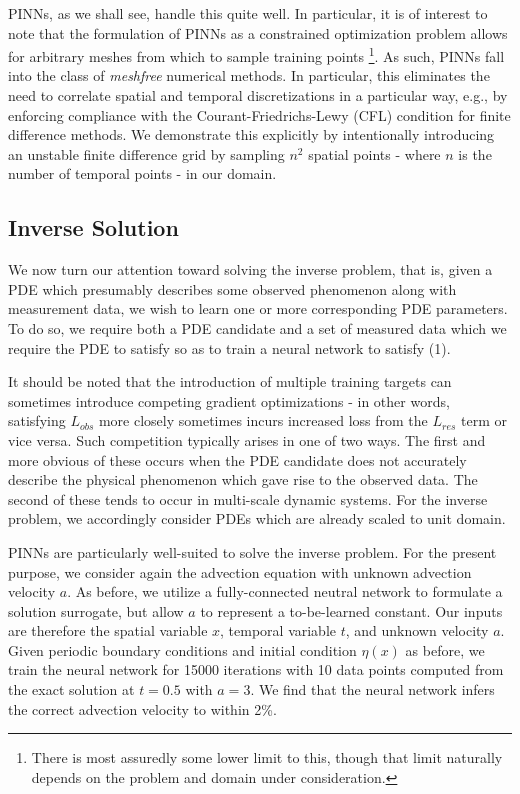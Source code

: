 \documentclass[letterpaper,11pt]{article}
\begin{document}
    PINNs, as we shall see, handle this quite well. In particular, it is of interest to note that the formulation of 
    PINNs as a constrained optimization problem allows for arbitrary meshes from which to sample training points 
    \footnote{
        There is most assuredly some lower limit to this, though that limit naturally depends on the problem and domain 
        under consideration.
    }. As such, PINNs fall into the class of \textit{meshfree} numerical methods. In particular, this eliminates
    the need to correlate spatial and temporal discretizations in a particular way, e.g., by enforcing compliance with
    the Courant-Friedrichs-Lewy (CFL) condition for finite difference methods. We demonstrate this explicitly by 
    intentionally introducing an unstable finite difference grid by sampling $n^2$ spatial points - where $n$ is the 
    number of temporal points - in our domain.

    \subsection*{Inverse Solution}
    We now turn our attention toward solving the inverse problem, that is, given a PDE which presumably describes some
    observed phenomenon along with measurement data, we wish to learn one or more corresponding PDE parameters. To do 
    so, we require both a PDE candidate and a set of measured data which we require the PDE to satisfy so as to train
    a neural network to satisfy (1).
    
    It should be noted that the introduction of multiple training targets can sometimes introduce competing gradient 
    optimizations - in other words, satisfying $L_{obs}$ more closely sometimes incurs increased loss from the $L_{res}$
    term or vice versa. Such competition typically arises in one of two ways. The first and more obvious of these occurs
    when the PDE candidate does not accurately describe the physical phenomenon which gave rise to the observed data.
    The second of these tends to occur in multi-scale dynamic systems.\cite{pino} For the inverse problem, we 
    accordingly consider PDEs which are already scaled to unit domain.

    PINNs are particularly well-suited to solve the inverse problem. For the present purpose, we consider again the
    advection equation with unknown advection velocity $a$. As before, we utilize a fully-connected neutral network to 
    formulate a solution surrogate, but allow $a$ to represent a to-be-learned constant. Our inputs are therefore the
    spatial variable $x$, temporal variable $t$, and unknown velocity $a$. Given periodic boundary conditions and 
    initial condition $\eta(x)$ as before, we train the neural network for 15000 iterations with 10 data points computed
    from the exact solution at $t = 0.5$ with $a = 3$. We find that the neural network infers the correct advection 
    velocity to within 2\%.
\end{document}
